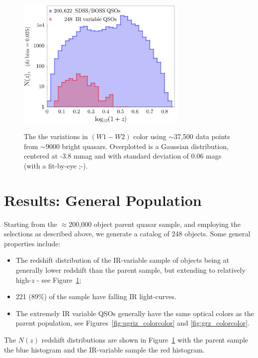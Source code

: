 \documentclass{emulateapj}
\begin{document}
\begin{figure}
  \includegraphics[width=8.20cm, height=7.00cm, 
  trim=0.0cm 0.0cm 0.1cm 0.0cm, clip]
  {../plots/Nofz/Nofz_20170331.pdf}
  \centering
  \caption[]{The the variations in $(W1-W2)$ color using
    $\sim$37,500 data points from $\sim$9000 bright quasars.
    Overplotted is a Gaussian distribution, centered at -3.8 mmag 
    and with standard deviation of 0.06 mags (with a fit-by-eye ;-).}
  \label{fig:Nofz}
\end{figure}

\section{Results: General Population}
Starting from the $\approx$200,000 object parent quasar sample, 
and employing the selections as described above, we generate a catalog 
of 248 objects. 
Some general properties include:
\begin{itemize}
    \item{
        The redshift distribution of the IR-variable sample of objects
        being at generally lower redshift than the parent sample, but
        extending to relatively high-$z$ - see Figure~\ref{fig:Nofz}}; 
    \item{221 (89\%) of the sample have falling IR light-curves.}
    \item{The extremely IR variable QSOs generally have the same
      optical colors as the parent population, see
      Figures~\ref{fig:ugriz_colorcolor} and \ref{fig:grz_colorcolor}.}
\end{itemize}
The $N(z)$ redshift distributions are shown in Figure~\ref{fig:Nofz}
with the parent sample the blue histogram and the IR-variable sample
the red histogram.
\end{document}
